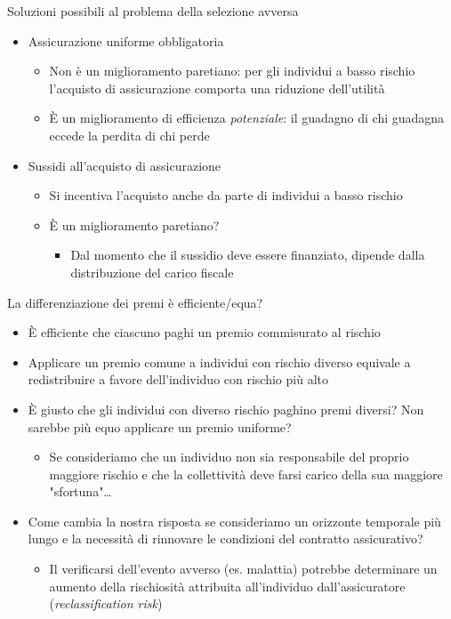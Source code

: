 \documentclass[aspectratio=149,11pt]{beamer}
\begin{document}
\begin{frame}{Soluzioni possibili al problema della selezione avversa}
\begin{itemize}
\item Assicurazione uniforme obbligatoria 

\begin{itemize}
\item Non è un miglioramento paretiano: per gli individui a basso
rischio l'acquisto di assicurazione comporta una riduzione dell'utilità

\item È un miglioramento di efficienza \emph{potenziale}: il guadagno di chi guadagna
eccede la perdita di chi perde
\end{itemize}

\item Sussidi all'acquisto di assicurazione

\begin{itemize}
\item Si incentiva l'acquisto anche da parte di individui a basso rischio

\item È un miglioramento paretiano?
\begin{itemize}
\item Dal momento che il sussidio deve essere finanziato, dipende dalla
distribuzione del carico fiscale
\end{itemize}
\end{itemize}
\end{itemize}
\end{frame}

\begin{frame}{La differenziazione dei premi è efficiente/equa?}
\begin{itemize}
\item È efficiente che ciascuno paghi un premio commisurato al rischio
\item Applicare un premio comune a individui con rischio diverso equivale a
redistribuire a favore dell'individuo con rischio più alto
\item È giusto che gli individui con diverso rischio paghino premi diversi? Non
sarebbe più equo applicare un premio uniforme?
\begin{itemize}
\item Se consideriamo che un individuo non sia responsabile del proprio maggiore
rischio e che la collettività deve farsi carico della sua maggiore
"sfortuna"\ldots{}
\end{itemize}
\item Come cambia la nostra risposta se consideriamo un orizzonte temporale più
lungo e la necessità di rinnovare le condizioni del contratto assicurativo?
\begin{itemize}
\item Il verificarsi dell'evento avverso (es. malattia) potrebbe
determinare un aumento della rischiosità attribuita all'individuo
dall'assicuratore (\emph{reclassification risk})
\end{itemize}
\end{itemize}
\end{frame}
\end{document}
